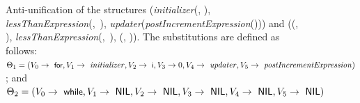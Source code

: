 \begin{figure}[p]
\centering{}
\caption[Complex anti-unification of two structures demonstrating a \protect\NIL{}-theory.]{Anti-unification of the structures (\textit{initializer}(, ), \mbox{\textit{lessThanExpression}(, ),} \textit{updater}(\textit{postIncrementExpression}())) and (\NIL{}(\NIL{}, \NIL{}), \mbox{\textit{lessThanExpression}(, ),} \NIL{}(\NIL{}, \NIL{})). The substitutions are defined as follows: $\Theta_1 = (V_0 \rightarrow \text{ \textsf{\small for}}, V_1 \rightarrow \text{ \textit{initializer}}, V_2 \rightarrow \text{ \textsf{\small i}}, V_3 \rightarrow 0, V_4 \rightarrow \text{ \textit{updater}}, V_5 \rightarrow \text{ \textit{postIncrementExpression}})$; and $\Theta_2 = (V_0 \rightarrow \text{ \textsf{\small while}}, V_1 \rightarrow \text{ \textsf{NIL}}, V_2 \rightarrow \text{ \textsf{NIL}}, V_3 \rightarrow \text{ \textsf{NIL}}, V_4 \rightarrow \text{ \textsf{NIL}}, V_5 \rightarrow \text{ \textsf{NIL}})$\label{fig:for-while}}
\end{figure}

